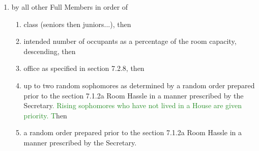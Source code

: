 \documentclass[10pt]{article} %
\begin{document}
\begin{itemize}
\begin{enumerate}[label=(\alph*)]
		\item by all other Full Members in order of 
		\begin{enumerate}[label=(\roman*)]
			\item class (seniors then juniors...), then 
			\item intended number of occupants as a percentage of the room capacity, descending, then 
			\item office as specified in section 7.2.8, then 
			\item up to two random sophomores as determined by a random order prepared prior to the section 7.1.2a Room Hassle in a manner prescribed by the Secretary\textcolor{ForestGreen}{. Rising sophomores who have not lived in a House are given priority. T}hen 
			\item a random order prepared prior to the section 7.1.2a Room Hassle in a manner prescribed by the Secretary.
		\end{enumerate}
	\end{enumerate}
\end{itemize}
\end{document}
